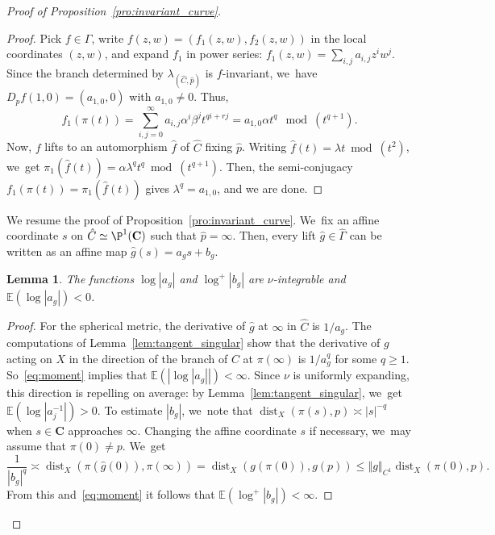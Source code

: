 \documentclass[JEP,XML,SOM,Unicode,published]{cedram}
\newcommand{\norm}[1]{{\left\Vert#1\right\Vert}}
\newcommand{\abs}[1]{\left\vert#1\right\vert}
\newcommand{\unsur}[1]{\frac{1}{#1}}
\newcommand{\inv}{^{-1}}
\DeclareMathOperator{\dist}{dist}
\newcommand{\ee}{\mathbb{E}}
\def\C{\mathbf{C}}
\theoremstyle{plain}
\newtheorem{lem}[thm]{Lemma}
\theoremstyle{definition}
\begin{document}
\begin{proof}[Proof of Proposition~\ref{pro:invariant_curve}]
\begin{proof}
Pick $f\in \Gamma$, write
$f(z,w) = (f_1(z,w), f_2(z,w))$ in the local coordinates $(z,w)$, and expand $f_1$ in power series: $f_1(z,w) = \sum_{i,j} a_{i,j}z^iw^j$.
Since the branch determined by $\lambda_{(\hat C, \hat{p})}$ is $f$-invariant, we~have $D_{p}f(1,0) = (a_{1,0}, 0)$ with $a_{1,0}\neq 0$. Thus,
\begin{equation*} f_1(\pi(t))
= \sum_{i,j=0}^\infty a_{i,j}\alpha^i\beta^j t^{qi+rj}
= a_{1, 0} \alpha t^q \mod(t^{q+1}).
\end{equation*}
Now, $f$ lifts to an automorphism $\hat f$ of $\hat C$ fixing $\hat p$. Writing
$\hat f(t) = \lambda t \bmod(t^2)$, we~get $\pi_1(\hat f(t)) = \alpha \lambda^q t^q \bmod(t^{q+1})$. Then,
the semi-conjugacy $f_1(\pi(t)) = \pi_1(\hat f(t))$ gives $ \lambda^q = a_{1, 0}$, and we are done.
\end{proof}

We resume the proof of Proposition~\ref{pro:invariant_curve}. We~fix an affine coordinate $s$ on $\hat C\simeq \P^1(\C)$ such that $\hat p = \infty$. Then, every lift $\hat g \in \hat\Gamma$ can be written as an affine map $\hat g(s) = a_g s+b_g$.

\begin{lem}\label{lem:integrability}
The functions $\log \abs{a_g}$ and $\log^+\abs{b_g}$ are $\nu$-integrable and \hbox{$\ee( \log \abs{a_g})\!<\!0$}.
\end{lem}

\begin{proof}
For the spherical metric, the derivative of $\hat g$ at $ \infty$ in $\hat C$ is $1/a_g$. The computations
of Lemma~\ref{lem:tangent_singular} show that the derivative
of $g$ acting on $X$ in the direction of the branch of $C$ at $\pi(\infty)$
is $1/a_g^q$ for some $q\geq 1$. So~\eqref{eq:moment} implies that $\ee( \abs{\log \abs{a_g}})<\infty$.
Since $\nu$ is uniformly expanding, this direction
is repelling on average: by Lemma~\ref{lem:tangent_singular}, we~get
$\ee( \log \abs{a_j\inv})>0$.
To estimate $\abs{b_g}$, we~note that
$\dist_X(\pi(s), p) \asymp \abs{s}^{-q}$ when $s\in \C$ approaches $\infty$. Changing the affine coordinate $s$ if necessary, we~may assume that
$\pi(0)\neq p$. We~get
\begin{equation*}
\unsur{\abs{b_g}^q} \asymp \dist_X (\pi(\hat g(0)), \pi(\infty)) = \dist_X(g(\pi(0)), g(p))\leq \norm{g}_{C^1} \dist_X(\pi(0), p).
\end{equation*}
From this and~\eqref{eq:moment} it follows that $\ee(\log^+\abs{b_g})<\infty$.
\end{proof}


\end{proof}
\end{document}
